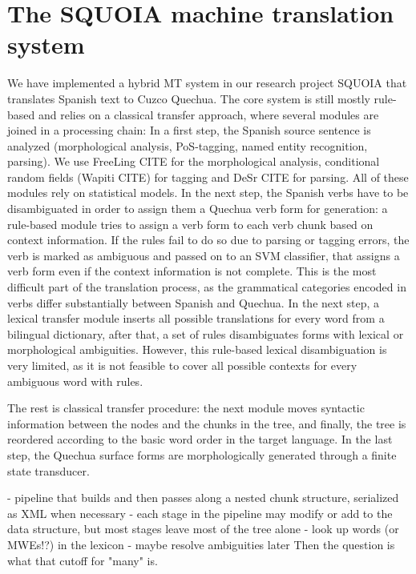 \documentclass[10pt, a4paper]{article}
\begin{document}
\section{The SQUOIA machine translation system}
We have implemented a hybrid MT system in our research project SQUOIA 
that translates Spanish text to Cuzco Quechua.
The core system is still mostly
rule-based and relies on a classical transfer approach, where several modules
are joined in a processing chain: In a first step, the Spanish source sentence
is analyzed (morphological analysis, PoS-tagging, named entity recognition,
parsing). We use FreeLing CITE for the morphological analysis, conditional
random fields (Wapiti CITE) for tagging and DeSr CITE for parsing. All of these
modules rely on statistical models. In the next step, the Spanish verbs have to
be disambiguated in order to assign them a Quechua verb form for generation: a
rule-based module tries to assign a verb form to each verb chunk based on
context information. If the rules fail to do so due to parsing or tagging
errors, the verb is marked as ambiguous and passed on to an SVM classifier,
that assigns a verb form even if the context information is not complete. This
is the most difficult part of the translation process, as the grammatical
categories encoded in verbs differ substantially between Spanish and Quechua.
In the next step, a lexical transfer module inserts all possible translations
for every word from a bilingual dictionary, after that, a set of rules
disambiguates forms with lexical or morphological ambiguities. However, this
rule-based lexical disambiguation is very limited, as it is not feasible to
cover all possible contexts for every ambiguous word with rules.

The rest is classical transfer procedure: the next module moves syntactic
information between the nodes and the chunks in the tree, and finally, the tree
is reordered according to the basic word order in the target language. In the
last step, the Quechua surface forms are morphologically generated through a
finite state transducer.

- pipeline that builds and then passes along a nested chunk structure, serialized as XML when necessary
- each stage in the pipeline may modify or add to the data structure, but most stages leave most of the tree alone
- look up words (or MWEs!?) in the lexicon
- maybe resolve ambiguities later
Then the question is what that cutoff for "many" is.
\end{document}
